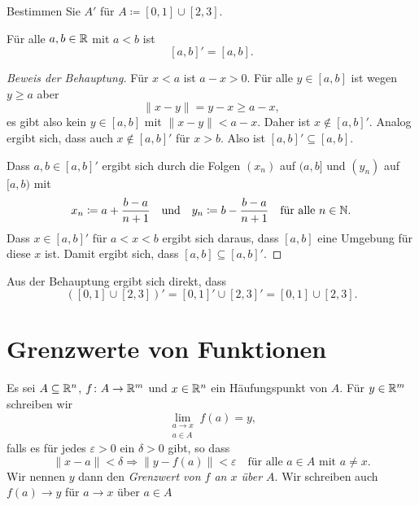 \documentclass[a4paper,10pt]{article}
\begin{document}
\begin{question}
 Bestimmen Sie $A'$ für $A \coloneqq [0,1] \cup [2,3]$.
\end{question}
\begin{solution}
 \begin{beh}
  Für alle $a, b \in \mathbb{R}$ mit $a < b$ ist
  \[
   [a,b]' = [a,b].
  \]
 \end{beh}
 \begin{proof}[Beweis der Behauptung]
  Für $x < a$  ist $a-x > 0$. Für alle $y \in [a,b]$ ist wegen $y \geq a$ aber
  \[
   \|x-y\| = y-x \geq a-x,
  \]
  es gibt also kein $y \in [a,b]$ mit $\|x-y\| < a-x$. Daher ist $x \notin [a,b]'$.  Analog ergibt sich, dass auch $x \notin [a,b]'$ für $x > b$. Also ist $[a,b]' \subseteq [a,b]$.
  
  Dass $a,b \in [a,b]'$ ergibt sich durch die Folgen $(x_n)$ auf $(a,b]$ und $(y_n)$ auf $[a,b)$ mit
  \[
   x_n \coloneqq a + \frac{b-a}{n+1}
   \quad
   \text{und}
   \quad
   y_n \coloneqq b - \frac{b-a}{n+1}
   \quad
   \text{für alle $n \in \mathbb{N}$}.
  \]
  Dass $x \in [a,b]'$ für $a < x < b$ ergibt sich daraus, dass $[a,b]$ eine Umgebung für diese $x$ ist. Damit ergibt sich, dass $[a,b] \subseteq [a,b]'$.
 \end{proof}
 
 Aus der Behauptung ergibt sich direkt, dass
 \[
  ([0,1] \cup [2,3])'
  = [0,1]' \cup [2,3]'
  = [0,1] \cup [2,3].
 \]
\end{solution}





\section{Grenzwerte von Funktionen}


\begin{defi}
 Es sei $A \subseteq \mathbb{R}^n$, $f \colon A \to \mathbb{R}^m$ und $x \in \mathbb{R}^n$ ein Häufungspunkt von $A$. Für $y \in \mathbb{R}^m$ schreiben wir
 \[
  \lim_{\substack{a \to x \\ a \in A}} f(a) = y,
 \]
 falls es für jedes $\varepsilon > 0$ ein $\delta > 0$ gibt, so dass
 \[
  \|x-a\| < \delta \Rightarrow \|y-f(a)\| < \varepsilon
  \quad
  \text{für alle $a \in A$ mit $a \neq x$}.
 \]
 Wir nennen $y$ dann den \emph{Grenzwert von $f$ an $x$ über $A$}. Wir schreiben auch $f(a) \to y$ für $a \to x$ über $a \in A$
\end{defi}


\end{document}
